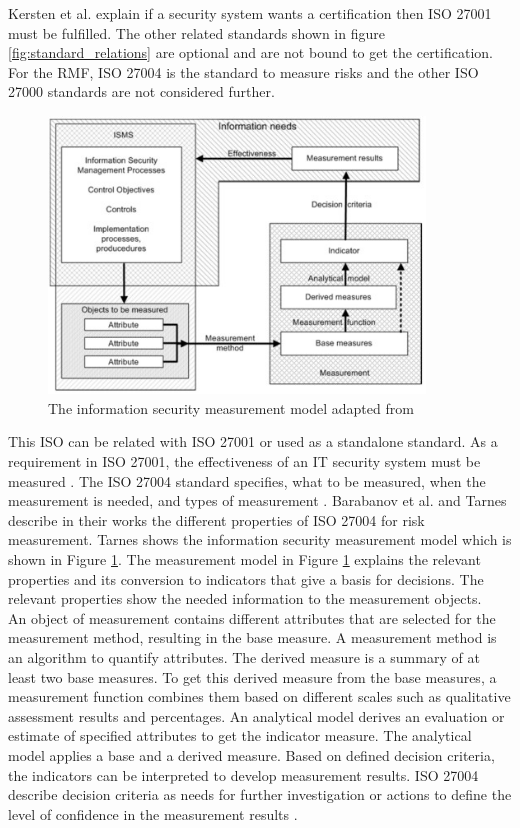 Kersten et al. \cite{kersten_reuter_schroeder_wolfenstetter_2013} explain if a security system wants a certification then ISO 27001 must be fulfilled. The other related standards shown in figure \ref{fig:standard_relations} are optional and are not bound to get the certification. For the RMF, ISO 27004 is the standard to measure risks and the other ISO 27000 standards are not considered further.

\begin{figure}[ht!]
  \centering
  \includegraphics[width=10cm]{pictures/is_measurement_model.jpg}
  \caption{The information security measurement model adapted from \cite{tarnes2012information}}
  \label{fig:is_measurement_model}
\end{figure}

This ISO can be related with ISO 27001 or used as a standalone standard. As a requirement in ISO 27001, the effectiveness of an IT security system must be measured \cite{barabanov2011information}. The ISO 27004 standard specifies, what to be measured, when the measurement is needed, and types of measurement \cite{lundholm2011design}. Barabanov et al. \cite{barabanov2011information} and
Tarnes \cite{tarnes2012information} describe in their works the different properties of ISO 27004 for risk measurement. Tarnes shows the information security measurement model which is shown in Figure \ref{fig:is_measurement_model}.
The measurement model in Figure \ref{fig:is_measurement_model} explains the relevant properties and its conversion to indicators that give a basis for decisions. The relevant properties show the needed information to the measurement objects. \\
An object of measurement contains different attributes that are selected for the measurement method, resulting in the base measure. A measurement method is an algorithm to quantify attributes. The derived measure is a summary of at least two base measures. To get this derived measure from the base measures, a measurement function combines them based on different scales such as qualitative assessment results and percentages. An analytical model derives an evaluation or estimate of specified attributes to get the indicator measure. The analytical model applies a base and a derived measure. Based on defined decision criteria, the indicators can be interpreted to develop measurement results. ISO 27004 describe decision criteria as needs for further investigation or actions to define the level of confidence in the measurement results \cite{ISO_27004_2009}. \\

